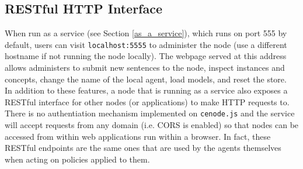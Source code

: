 \documentclass{scrartcl}
\begin{document}



\subsection{RESTful HTTP Interface}
\label{api_rest}
When run as a service (see Section \ref{as_a_service}), which runs on port 555 by default, users can visit \texttt{localhost:5555} to administer the node (use a different hostname if not running the node locally). The webpage served at this address allows administers to submit new sentences to the node, inspect instances and concepts, change the name of the local agent, load models, and reset the store.\\

In addition to these features, a node that is running as a service also exposes a RESTful interface for other nodes (or applications) to make HTTP requests to. There is no authentiation mechanism implemented on \texttt{cenode.js} and the service will accept requests from any domain (i.e. CORS is enabled) so that nodes can be accessed from within web applications run within a browser. In fact, these RESTful endpoints are the same ones that are used by the agents themselves when acting on policies applied to them.

\end{document}
